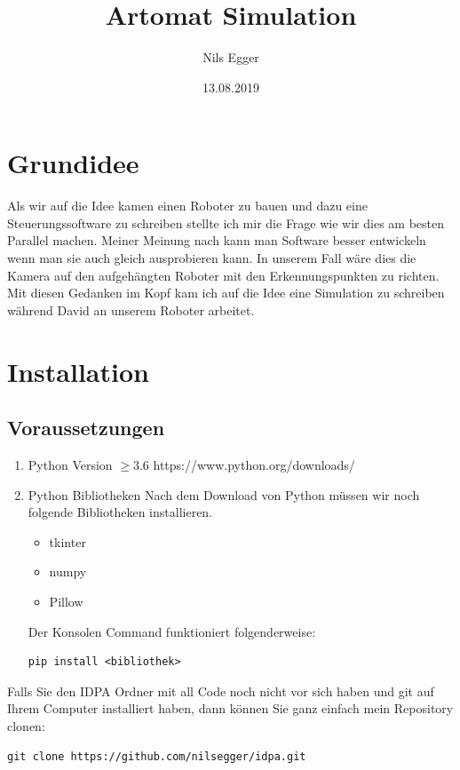 \documentclass[12pt]{article}
\title{Artomat Simulation}
\author{Nils Egger}
\date{13.08.2019}
\begin{document}
\maketitle
\tableofcontents 

\section{Grundidee}

Als wir auf die Idee kamen einen Roboter zu bauen und dazu eine Steuerungssoftware zu schreiben stellte ich mir die Frage wie wir dies am besten Parallel machen. Meiner Meinung nach kann man Software besser entwickeln wenn man sie auch gleich ausprobieren kann. In unserem Fall wäre dies die Kamera auf den aufgehängten Roboter mit den Erkennungspunkten zu richten. Mit diesen Gedanken im Kopf kam ich auf die Idee eine Simulation zu schreiben während David an unserem Roboter arbeitet.

\section{Installation}
\subsection{Voraussetzungen}
\begin{enumerate}
\item Python Version $\geq 3.6$\newline
https://www.python.org/downloads/
\item Python Bibliotheken \newline
Nach dem Download von Python müssen wir noch folgende Bibliotheken installieren. 
\begin{itemize}
	\item tkinter
	\item numpy
	\item Pillow
\end{itemize}
Der Konsolen Command funktioniert folgenderweise:
\begin{lstlisting}
pip install <bibliothek>
\end{lstlisting}
\end{enumerate}
Falls Sie den IDPA Ordner mit all Code noch nicht vor sich haben und git auf Ihrem Computer installiert haben, dann können Sie ganz einfach mein Repository clonen:
\begin{lstlisting}
git clone https://github.com/nilsegger/idpa.git
\end{lstlisting}
\end{document}
